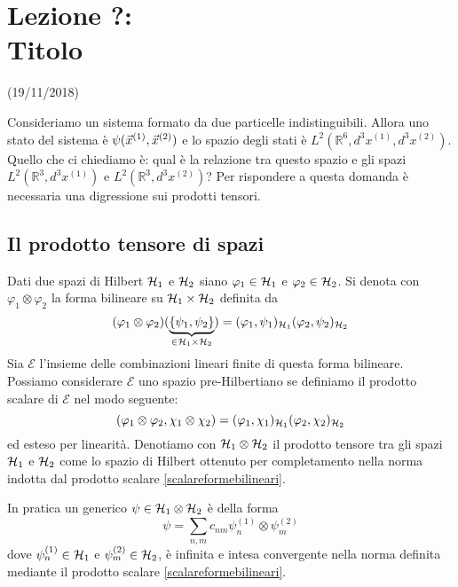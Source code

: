 \documentclass[../../FisicaTeorica.tex]{subfiles}
\begin{document}
\section{Lezione ?:\\ \large{Titolo}}
\vspace{-1em}
\begin{center}
    \small{(19/11/2018)}
\end{center}

Consideriamo un sistema formato da due particelle indistinguibili. Allora uno stato del sistema è $\psi(\vec x^{(1)}, \vec x^{(2)})$ e lo spazio degli stati è $L^2(\mathbb R^6, d^3 x^{(1)}, d^3 x^{(2)})$. Quello che ci chiediamo è: qual è la relazione tra questo spazio e gli spazi $L^2(\mathbb R^3, d^3 x^{(1)})$ e $L^2(\mathbb R^3, d^3 x^{(2)})$? Per rispondere a questa domanda è necessaria una digressione sui prodotti tensori.

\subsection{Il prodotto tensore di spazi}

\begin{dfn}
Dati due spazi di Hilbert $\mathcal{H}_1$ e $\mathcal{H}_2$ siano $\varphi_1 \in \mathcal{H}_1$ e $\varphi_2 \in \mathcal{H}_2$. Si denota con $\varphi_1 \otimes \varphi_2$ la forma bilineare su $\mathcal{H}_1 \times \mathcal{H}_2$ definita da
\[
(\varphi_1 \otimes \varphi_2) (\underbrace{\{ \psi_1 , \psi_2 \}}_{\in \mathcal{H}_1 \times \mathcal{H}_2}) = (\varphi_1, \psi_1)_{\mathcal{H}_1} (\varphi_2, \psi_2)_{\mathcal{H}_2} 
\]
Sia $\mathcal E$ l’insieme delle combinazioni lineari finite di questa forma bilineare. Possiamo considerare $\mathcal E$ uno spazio pre-Hilbertiano se definiamo il prodotto scalare di $\mathcal E$ nel modo seguente:
\begin{equation}
\label{eqn:scalareformebilineari}
(\varphi_1 \otimes \varphi_2, \chi_1 \otimes \chi_2) = (\varphi_1, \chi_1)_{\mathcal{H}_1} (\varphi_2, \chi_2)_{\mathcal{H}_2}
\end{equation}
ed esteso per linearità. Denotiamo con $\mathcal{H}_1 \otimes \mathcal{H}_2$ il prodotto tensore tra gli spazi $\mathcal{H}_1$ e $\mathcal{H}_2$ come lo spazio di Hilbert ottenuto per completamento nella norma indotta dal prodotto scalare \eqref{scalareformebilineari}.
\end{dfn}

In pratica un generico $\psi \in \mathcal{H}_1 \otimes \mathcal{H}_2$ è della forma
\[
\psi = \sum_{n,m} c_{nm} \psi_n^{(1)} \otimes \psi_m^{(2)}
\]
dove $\psi_n^{(1)} \in \mathcal{H}_1$ e $\psi_m^{(2)} \in \mathcal{H}_2$, è infinita e intesa convergente nella norma definita mediante il prodotto scalare \eqref{scalareformebilineari}.
\end{document}
